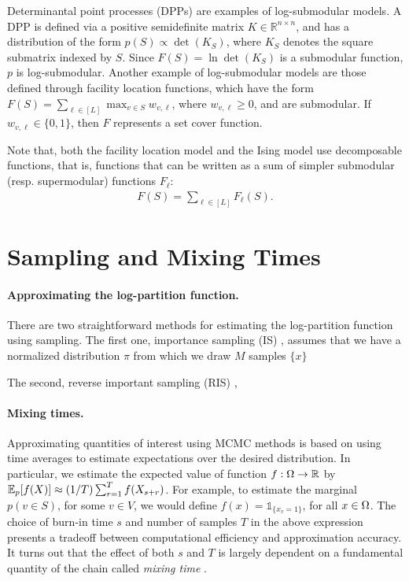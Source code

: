 Determinantal point processes (DPPs) are examples of log-submodular models.
A DPP is defined via a positive semidefinite matrix $K \in \mathbb{R}^{n \times n}$, and has a distribution of the form $p(S) \propto \det(K_S)$, where $K_S$ denotes the square submatrix indexed by $S$.
Since $F(S) = \ln \det(K_S)$ is a submodular function, $p$ is log-submodular.
Another example of log-submodular models are those defined through facility location functions, which have the form $F(S) = \sum_{\ell \in [L]} \max_{v \in S}w_{v,\ell}$, where $w_{v,\ell} \geq 0$, and are submodular.
If $w_{v,\ell} \in \{0, 1\}$, then $F$ represents a set cover function.

Note that, both the facility location model and the Ising model use decomposable functions, that is, functions that can be written as a sum of simpler submodular (resp. supermodular) functions $F_{\ell}$:
\begin{align} \label{eq:fdec}
F(S) = \sum_{\ell \in [L]} F_{\ell}(S).
\end{align}

\section{Sampling and Mixing Times}

\paragraph{Approximating the log-partition function.}
There are two straightforward methods for estimating the log-partition function using sampling.
The first one, importance sampling (IS) \citep{ais}, assumes that we have a normalized distribution $\pi$ from which we draw $M$ samples $\{x\}$

The second, reverse important sampling (RIS) \citep{ris},

\paragraph{Mixing times.}
Approximating quantities of interest using MCMC methods is based on using time averages to estimate expectations over the desired distribution.
In particular, we estimate the expected value of function $f : \ss \to \mathbb{R}$ by $\E_p[f(X)] \approx (1/T)\sum_{r=1}^{T} f(X_{s + r})$.
For example, to estimate the marginal $p(v \in S)$, for some $v \in V$, we would define $f(x) = \mathds{1}_{\{x_v = 1\}}$, for all $x \in \ss$.
The choice of burn-in time $s$ and number of samples $T$ in the above expression presents a tradeoff between computational efficiency and approximation accuracy.
It turns out that the effect of both $s$ and $T$ is largely dependent on a fundamental quantity of the chain called \emph{mixing time} \cite{levin08}.

